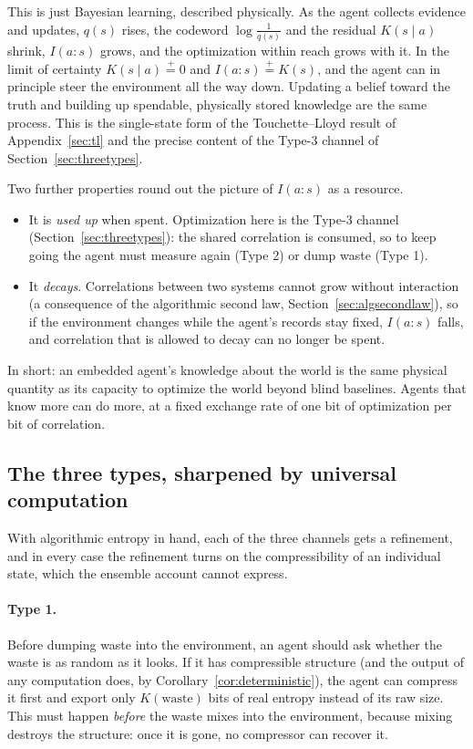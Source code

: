 \documentclass[10pt]{article}
\theoremstyle{definition}
\theoremstyle{remark}
\newcommand{\peq}{\mathrel{\stackrel{+}{=}}}
\begin{document}
This is just Bayesian learning, described physically. As the agent collects evidence and updates, $q(s)$ rises, the codeword $\log\tfrac{1}{q(s)}$ and the residual $K(s\mid a)$ shrink, $I(a:s)$ grows, and the optimization within reach grows with it. In the limit of certainty $K(s\mid a) \peq 0$ and $I(a:s) \peq K(s)$, and the agent can in principle steer the environment all the way down. Updating a belief toward the truth and building up spendable, physically stored knowledge are the same process. This is the single-state form of the Touchette--Lloyd result of Appendix~\ref{sec:tl} and the precise content of the Type-3 channel of Section~\ref{sec:threetypes}.

Two further properties round out the picture of $I(a:s)$ as a resource.
\begin{itemize}[leftmargin=2em]
  \item It is \emph{used up} when spent. Optimization here is the Type-3 channel (Section~\ref{sec:threetypes}): the shared correlation is consumed, so to keep going the agent must measure again (Type 2) or dump waste (Type 1).
  \item It \emph{decays}. Correlations between two systems cannot grow without interaction (a consequence of the algorithmic second law, Section~\ref{sec:algsecondlaw}), so if the environment changes while the agent's records stay fixed, $I(a:s)$ falls, and correlation that is allowed to decay can no longer be spent.
\end{itemize}

In short: an embedded agent's knowledge about the world is the same physical quantity as its capacity to optimize the world beyond blind baselines. Agents that know more can do more, at a fixed exchange rate of one bit of optimization per bit of correlation.

\subsection{The three types, sharpened by universal computation}
\label{sec:typesharpen}

With algorithmic entropy in hand, each of the three channels gets a refinement, and in every case the refinement turns on the compressibility of an individual state, which the ensemble account cannot express.

\paragraph{Type 1.} Before dumping waste into the environment, an agent should ask whether the waste is as random as it looks. If it has compressible structure (and the output of any computation does, by Corollary~\ref{cor:deterministic}), the agent can compress it first and export only $K(\text{waste})$ bits of real entropy instead of its raw size. This must happen \emph{before} the waste mixes into the environment, because mixing destroys the structure: once it is gone, no compressor can recover it.
\end{document}
